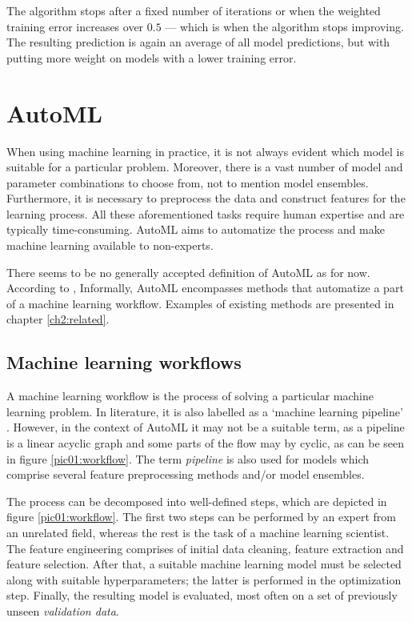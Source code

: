 The algorithm stops after a fixed number of iterations or when the weighted
training error increases over $0.5$ --- which is when the algorithm stops
improving. The resulting prediction is again an average of all model
predictions, but with putting more weight on models with a lower training
error. \citep[335]{Flach:2012:MLA:2490546}

\section{AutoML}
When using machine learning in practice, it is not always evident which model
is suitable for a particular problem. Moreover, there is a vast number of model
and parameter combinations to choose from, not to mention model ensembles.
Furthermore, it is necessary to preprocess the data and construct features
for the learning process. All these aforementioned tasks require human 
expertise and are typically time-consuming. AutoML aims to automatize the
process and make machine learning available to non-experts.

There seems to be no generally accepted definition of AutoML as for now.
According to \cite{DBLP:journals/corr/abs-1810-13306},
Informally, AutoML encompasses methods that automatize a part of a machine
learning workflow. Examples of existing methods are presented in chapter
\ref{ch2:related}.

\subsection{Machine learning workflows}
A machine learning workflow is the process of solving a particular machine
learning problem. In literature, it is also labelled as a `machine learning
pipeline' \cite{DBLP:journals/corr/abs-1810-13306}. However, in the context
of AutoML it may not be a suitable term, as a pipeline is a linear acyclic
graph and some parts of the flow may by cyclic, as can be seen
in figure \ref{pic01:workflow}. The term \emph{pipeline} is also used for
models which comprise several feature preprocessing methods and/or model
ensembles. %

The process can be decomposed into well-defined steps, which are depicted in
figure \ref{pic01:workflow}. The first two steps can be performed
by an expert from an unrelated field, whereas the rest is the task of a machine
learning scientist. The feature engineering comprises of initial data cleaning,
feature extraction and feature selection. %
After that, a suitable machine learning model must be selected along with
suitable hyperparameters; the latter is performed in the optimization step.
Finally, the resulting model is evaluated, most often on a set of previously
unseen \emph{validation data}.

